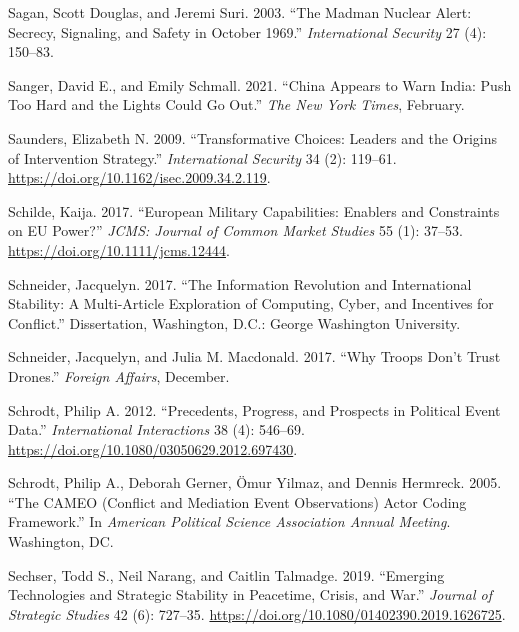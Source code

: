 \documentclass[
]{article}
\begin{document}
\leavevmode\hypertarget{ref-sagan_madmannuclearalert_2003}{}%
Sagan, Scott Douglas, and Jeremi Suri. 2003. ``The Madman Nuclear Alert: Secrecy, Signaling, and Safety in October 1969.'' \emph{International Security} 27 (4): 150--83.

\leavevmode\hypertarget{ref-sanger_chinaappearswarn_2021}{}%
Sanger, David E., and Emily Schmall. 2021. ``China Appears to Warn India: Push Too Hard and the Lights Could Go Out.'' \emph{The New York Times}, February.

\leavevmode\hypertarget{ref-saunders_transformativechoicesleaders_2009}{}%
Saunders, Elizabeth N. 2009. ``Transformative Choices: Leaders and the Origins of Intervention Strategy.'' \emph{International Security} 34 (2): 119--61. \url{https://doi.org/10.1162/isec.2009.34.2.119}.

\leavevmode\hypertarget{ref-schilde_europeanmilitarycapabilities_2017}{}%
Schilde, Kaija. 2017. ``European Military Capabilities: Enablers and Constraints on EU Power?'' \emph{JCMS: Journal of Common Market Studies} 55 (1): 37--53. \url{https://doi.org/10.1111/jcms.12444}.

\leavevmode\hypertarget{ref-schneider_informationrevolutioninternational_2017}{}%
Schneider, Jacquelyn. 2017. ``The Information Revolution and International Stability: A Multi-Article Exploration of Computing, Cyber, and Incentives for Conflict.'' Dissertation, Washington, D.C.: George Washington University.

\leavevmode\hypertarget{ref-schneider_whytroopsdon_2017}{}%
Schneider, Jacquelyn, and Julia M. Macdonald. 2017. ``Why Troops Don't Trust Drones.'' \emph{Foreign Affairs}, December.

\leavevmode\hypertarget{ref-schrodt_precedentsprogressprospects_2012}{}%
Schrodt, Philip A. 2012. ``Precedents, Progress, and Prospects in Political Event Data.'' \emph{International Interactions} 38 (4): 546--69. \url{https://doi.org/10.1080/03050629.2012.697430}.

\leavevmode\hypertarget{ref-schrodt_cameoconflictmediation_2005}{}%
Schrodt, Philip A., Deborah Gerner, Ömur Yilmaz, and Dennis Hermreck. 2005. ``The CAMEO (Conflict and Mediation Event Observations) Actor Coding Framework.'' In \emph{American Political Science Association Annual Meeting}. Washington, DC.

\leavevmode\hypertarget{ref-sechser_emergingtechnologiesstrategic_2019}{}%
Sechser, Todd S., Neil Narang, and Caitlin Talmadge. 2019. ``Emerging Technologies and Strategic Stability in Peacetime, Crisis, and War.'' \emph{Journal of Strategic Studies} 42 (6): 727--35. \url{https://doi.org/10.1080/01402390.2019.1626725}.
\end{document}

